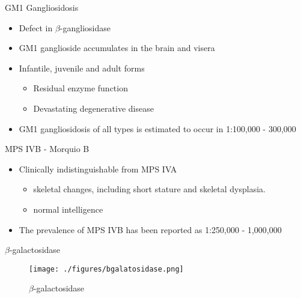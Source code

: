 \documentclass[presentation, smaller]{beamer}
\begin{document}
\begin{frame}[label={sec:orgheadline2}]{GM1 Gangliosidosis}
\begin{itemize}
\item Defect in \(\beta\)-gangliosidase
\item GM1 ganglioside accumulates in the brain and visera
\item Infantile, juvenile and adult forms
\begin{itemize}
\item Residual enzyme function
\item Devastating degenerative disease
\end{itemize}
\item GM1 gangliosidosis of all types is estimated to occur in 1:100,000 - 300,000
\end{itemize}

\begin{block}{MPS IVB - Morquio B}
\begin{itemize}
\item Clinically indistinguishable from MPS IVA
\begin{itemize}
\item skeletal changes, including short stature and skeletal dysplasia.
\item normal intelligence
\end{itemize}
\item The prevalence of MPS IVB has been reported as 1:250,000 - 1,000,000
\end{itemize}
\end{block}
\end{frame}


\begin{frame}[label={sec:orgheadline3}]{\(\beta\)-galactosidase}
\begin{figure}[htb]
\centering
\texttt{[image: ./figures/bgalatosidase.png]}
\caption[bgal]{\label{fig:bgal}
\(\beta\)-galactosidase}
\end{figure}
\end{frame}
\end{document}

